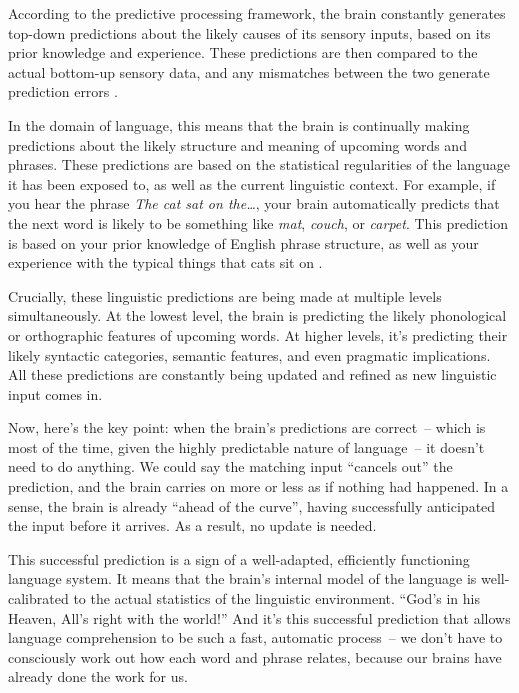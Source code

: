 According to the predictive processing framework, the brain constantly generates top-down predictions about the likely causes of its sensory inputs, based on its prior knowledge and experience. These predictions are then compared to the actual bottom-up sensory data, and any mismatches between the two generate prediction errors \citep{Clark2013,Friston2010}.

In the domain of language, this means that the brain is continually making predictions about the likely structure and meaning of upcoming words and phrases. These predictions are based on the statistical regularities of the language it has been exposed to, as well as the current linguistic context. For example, if you hear the phrase \textit{The cat sat on the\dots}, your brain automatically predicts that the next word is likely to be something like \textit{mat}, \textit{couch}, or \textit{carpet}. This prediction is based on your prior knowledge of English phrase structure, as well as your experience with the typical things that cats sit on \citep{Kuperberg2016}.

Crucially, these linguistic predictions are being made at multiple levels simultaneously. At the lowest level, the brain is predicting the likely phonological or orthographic features of upcoming words. At higher levels, it's predicting their likely syntactic categories, semantic features, and even pragmatic implications. All these predictions are constantly being updated and refined as new linguistic input comes in.

Now, here's the key point: when the brain's predictions are correct~-- which is most of the time, given the highly predictable nature of language~-- it doesn't need to do anything. We could say the matching input ``cancels out'' the prediction, and the brain carries on more or less as if nothing had happened. In a sense, the brain is already ``ahead of the curve'', having successfully anticipated the input before it arrives. As a result, no update is needed. 

This successful prediction is a sign of a well-adapted, efficiently functioning language system. It means that the brain's internal model of the language is well-calibrated to the actual statistics of the linguistic environment. ``God's in his Heaven, All's right with the world!'' And it's this successful prediction that allows language comprehension to be such a fast, automatic process~-- we don't have to consciously work out how each word and phrase relates, because our brains have already done the work for us.

